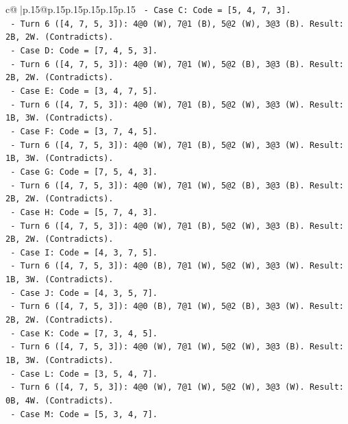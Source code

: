 \documentclass{article}
\begin{document}
{\begin{supertabular}{c@{$\;$}|p{.15\linewidth}@{}p{.15\linewidth}p{.15\linewidth}p{.15\linewidth}p{.15\linewidth}p{.15\linewidth}}
{{{\texttt{      {-} Case C: Code = {[}5, 4, 7, 3{]}.} \\
\texttt{        {-} Turn 6 ({[}4, 7, 5, 3{]}): 4@0 (W), 7@1 (B), 5@2 (W), 3@3 (B). Result: 2B, 2W. (Contradicts).} \\
\texttt{      {-} Case D: Code = {[}7, 4, 5, 3{]}.} \\
\texttt{        {-} Turn 6 ({[}4, 7, 5, 3{]}): 4@0 (W), 7@1 (W), 5@2 (B), 3@3 (B). Result: 2B, 2W. (Contradicts).} \\
\texttt{      {-} Case E: Code = {[}3, 4, 7, 5{]}.} \\
\texttt{        {-} Turn 6 ({[}4, 7, 5, 3{]}): 4@0 (W), 7@1 (B), 5@2 (W), 3@3 (W). Result: 1B, 3W. (Contradicts).} \\
\texttt{      {-} Case F: Code = {[}3, 7, 4, 5{]}.} \\
\texttt{        {-} Turn 6 ({[}4, 7, 5, 3{]}): 4@0 (W), 7@1 (B), 5@2 (W), 3@3 (W). Result: 1B, 3W. (Contradicts).} \\
\texttt{      {-} Case G: Code = {[}7, 5, 4, 3{]}.} \\
\texttt{        {-} Turn 6 ({[}4, 7, 5, 3{]}): 4@0 (W), 7@1 (W), 5@2 (B), 3@3 (B). Result: 2B, 2W. (Contradicts).} \\
\texttt{      {-} Case H: Code = {[}5, 7, 4, 3{]}.} \\
\texttt{        {-} Turn 6 ({[}4, 7, 5, 3{]}): 4@0 (W), 7@1 (B), 5@2 (W), 3@3 (B). Result: 2B, 2W. (Contradicts).} \\
\texttt{      {-} Case I: Code = {[}4, 3, 7, 5{]}.} \\
\texttt{        {-} Turn 6 ({[}4, 7, 5, 3{]}): 4@0 (B), 7@1 (W), 5@2 (W), 3@3 (W). Result: 1B, 3W. (Contradicts).} \\
\texttt{      {-} Case J: Code = {[}4, 3, 5, 7{]}.} \\
\texttt{        {-} Turn 6 ({[}4, 7, 5, 3{]}): 4@0 (B), 7@1 (W), 5@2 (B), 3@3 (W). Result: 2B, 2W. (Contradicts).} \\
\texttt{      {-} Case K: Code = {[}7, 3, 4, 5{]}.} \\
\texttt{        {-} Turn 6 ({[}4, 7, 5, 3{]}): 4@0 (W), 7@1 (W), 5@2 (W), 3@3 (B). Result: 1B, 3W. (Contradicts).} \\
\texttt{      {-} Case L: Code = {[}3, 5, 4, 7{]}.} \\
\texttt{        {-} Turn 6 ({[}4, 7, 5, 3{]}): 4@0 (W), 7@1 (W), 5@2 (W), 3@3 (W). Result: 0B, 4W. (Contradicts).} \\
\texttt{      {-} Case M: Code = {[}5, 3, 4, 7{]}.} \\
}}}
\end{supertabular}}
\end{document}
